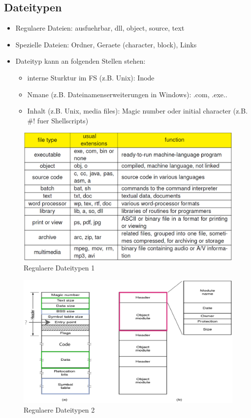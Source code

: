 \documentclass[a4paper]{scrreprt}
\begin{document}
\subsection{Dateitypen}
\begin{itemize}
	\item Regulaere Dateien: ausfuehrbar, dll, object, source, text
	\item Spezielle Dateien: Ordner, Geraete (character, block), Links
	\item Dateityp kann an folgenden Stellen stehen:
		\begin{itemize}
			\item interne Sturktur im FS (z.B. Unix): Inode
			\item Nmane (z.B. Dateinamenserweiterungen in Windows): .com, .exe..
			\item Inhalt (z.B. Unix, media files): Magic number oder initial character (z.B. \#! fuer Shellscripts)
		\end{itemize}
\end{itemize}

\begin{figure}[ht]
\centering
\includegraphics[scale=0.3]{graphics/regular_filetypes.png}
\caption{Regulaere Dateitypen 1}
\end{figure}

\begin{figure}[ht]
\centering
\includegraphics[scale=0.4]{graphics/regular_filetypes2.png}
\caption{Regulaere Dateitypen 2}
\end{figure}
\end{document}
